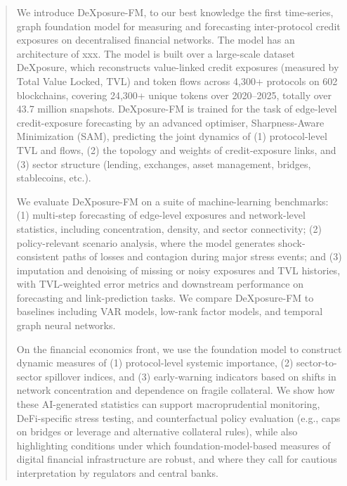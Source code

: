 \documentclass[preprint,12pt]{elsarticle}
\begin{document}
\begin{frontmatter}




\begin{abstract}
We introduce DeXposure-FM, to our best knowledge the first time-series, graph foundation model for measuring and forecasting inter-protocol credit exposures on decentralised financial networks. The model has an architecture of xxx. The model is built over a large-scale dataset DeXposure, which reconstructs value-linked credit exposures (measured by Total Value Locked, TVL) and token flows across 4,300+ protocols on 602 blockchains, covering 24,300+ unique tokens over 2020--2025, totally over 43.7 million snapshots. DeXposure-FM is trained for the task of edge-level credit-exposure forecasting by an advanced optimiser, Sharpness-Aware Minimization (SAM), predicting the joint dynamics of (1) protocol-level TVL and flows, (2) the topology and weights of credit-exposure links, and (3) sector structure (lending, exchanges, asset management, bridges, stablecoins, etc.).

We evaluate DeXposure-FM on a suite of machine-learning benchmarks: (1) multi-step forecasting of edge-level exposures and network-level statistics, including concentration, density, and sector connectivity; (2) policy-relevant scenario analysis, where the model generates shock-consistent paths of losses and contagion during major stress events; and (3) imputation and denoising of missing or noisy exposures and TVL histories, with TVL-weighted error metrics and downstream performance on forecasting and link-prediction tasks. We compare DeXposure-FM to baselines including VAR models, low-rank factor models, and temporal graph neural networks.

On the financial economics front, we use the foundation model to construct dynamic measures of (1) protocol-level systemic importance, (2) sector-to-sector spillover indices, and (3) early-warning indicators based on shifts in network concentration and dependence on fragile collateral. We show how these AI-generated statistics can support macroprudential monitoring, DeFi-specific stress testing, and counterfactual policy evaluation (e.g., caps on bridges or leverage and alternative collateral rules), while also highlighting conditions under which foundation-model-based measures of digital financial infrastructure are robust, and where they call for cautious interpretation by regulators and central banks.


\end{abstract}
\end{frontmatter}
\end{document}
